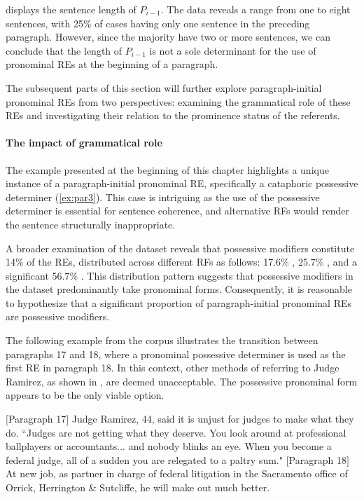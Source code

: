  displays the sentence length of $P_{i-1}$. The data reveals a range from one to eight sentences, with 25\% of cases having only one sentence in the preceding paragraph. However, since the majority have two or more sentences, we can conclude that the length of $P_{i-1}$ is not a sole determinant for the use of pronominal REs at the beginning of a paragraph.

The subsequent parts of this section will further explore paragraph-initial pronominal REs from two perspectives: examining the grammatical role of these REs and investigating their relation to the prominence status of the referents.

\paragraph*{The impact of grammatical role}

The example presented at the beginning of this chapter highlights a unique instance of a paragraph-initial pronominal RE, specifically a cataphoric possessive determiner (\ref{ex:par3}). This case is intriguing as the use of the possessive determiner  is essential for sentence coherence, and alternative RFs would render the sentence structurally inappropriate.

A broader examination of the \wsj dataset reveals that possessive modifiers constitute 14\% of the REs, distributed across different RFs as follows: 17.6\% , 25.7\% , and a significant 56.7\% . This distribution pattern suggests that possessive modifiers in the dataset predominantly take pronominal forms. Consequently, it is reasonable to hypothesize that a significant proportion of paragraph-initial pronominal REs are possessive modifiers.

The following example from the \wsj corpus illustrates the transition between paragraphs 17 and 18, where a pronominal possessive determiner is used as the first RE in paragraph 18. In this context, other methods of referring to Judge Ramirez, as shown in , are deemed unacceptable. The possessive pronominal form appears to be the only viable option.

\begin{exe}
	\ex \example{wsj-0049}
	\begin{xlist}
		\ex $[$Paragraph 17$]$ Judge Ramirez, 44, said it is unjust for judges to make what they do. ``Judges are not getting what they deserve. You look around at professional ballplayers or accountants... and nobody blinks an eye. When you become a federal judge, all of a sudden you are relegated to a paltry sum."
		\ex\label{ex:ramirezposs} $[$Paragraph 18$]$ At  new job, as partner in charge of federal litigation in the Sacramento office of Orrick, Herrington \& Sutcliffe, he will make out much better.

	\end{xlist}
\end{exe}


